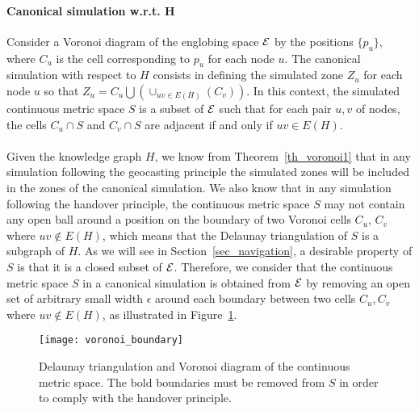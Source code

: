 \documentclass{article}
\newcommand{\englobing}{{\cal E}}
\begin{document}
\paragraph{Canonical simulation w.r.t. H} Consider a Voronoi diagram of the englobing space $\englobing$ by the positions $\{p_u\}$, where $C_u$ is the cell corresponding to $p_u$ for each node $u$. The canonical simulation with respect to $H$ consists in defining the simulated zone $Z_u$ for each node $u$ so that $Z_u = C_u\bigcup (\cup_{uv\in E(H)} (C_v))$. In this context, the simulated continuous metric space $S$ is a subset of $\englobing$ such that for each pair $u,v$ of nodes, the cells $C_u\cap S$ and $C_v\cap S$ are adjacent if and only if $uv\in E(H)$.

\paragraph{}
Given the knowledge graph $H$, we know from Theorem~\ref{th_voronoi1} that in any simulation following the geocasting principle the simulated zones will be included in the zones of the canonical simulation. We also know that in any simulation following the handover principle, the continuous metric space $S$ may not contain any open ball around a position on the boundary of two Voronoi cells $C_u$, $C_v$ where $uv\notin E(H)$, which means that the Delaunay triangulation of $S$ is a subgraph of $H$.
 As we will see in Section~\ref{sec_navigation}, a desirable property of $S$ is that it is a closed subset of $\englobing$. Therefore, we consider that the continuous metric space $S$ in a canonical simulation is obtained from $\englobing$ by removing an open set of arbitrary small width $\epsilon$ around each boundary between two cells $C_u,C_v$ where $uv\notin E(H)$, as illustrated in Figure~\ref{fig_delaunay}.

\begin{figure}[htb]
\begin{center}
\texttt{[image: voronoi\_boundary]}
\caption{Delaunay triangulation and Voronoi diagram of the continuous metric space. The bold boundaries must be removed from $S$ in order to comply with the handover principle.}
\label{fig_delaunay}
\end{center}
\end{figure}
\end{document}
